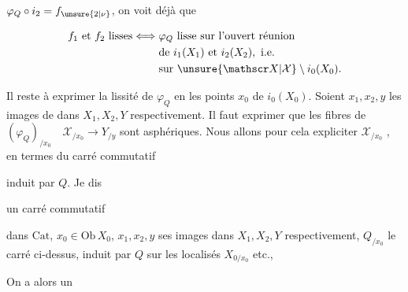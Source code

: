 $\varphi_Q\circ i_2=f_{\unsure{2|\nu}}$, on voit déjà que

\[
\begin{aligned}
f_1\text{ et }f_2\text{ lisses}\Longleftrightarrow {}&\varphi_Q\text{ lisse sur l'ouvert réunion}\\
&\text{de }i_1(X_1)\text{ et }i_2(X_2),\ \text{i.e.}\\
&\text{sur }\unsure{\mathscr X|\mathcal X}\setminus i_0(X_0).
\end{aligned}
\]

Il reste à exprimer la lissité de $\varphi_Q$ en les points $x_0$ de $i_0(X_0)$. Soient $x_1,x_2,y$ les images de  dans $X_1,X_2,Y$ respectivement. Il faut exprimer que les fibres de  $(\varphi_Q)_{/x_0}\quad\mathscr X_{/x_0}\longrightarrow Y_{/y}$ sont asphériques.  Nous allons pour cela expliciter $\mathscr X_{/x_0}$ , en termes du carré commutatif


induit par $Q$. Je dis

  un carré commutatif 


dans $\mathrm{Cat}$, $x_0\in\mathrm{Ob}\,X_0$, $x_1,x_2,y$ ses images dans $X_1,X_2,Y$ respectivement, $Q_{/x_0}$ le carré  ci-dessus, induit par $Q$ sur les localisés $X_{0/x_0}$ etc.,


On a alors un
